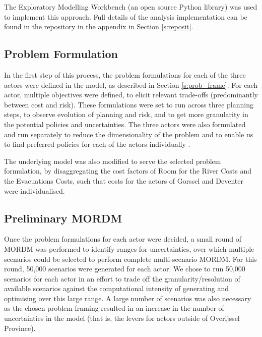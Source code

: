 The Exploratory Modelling Workbench (an open source Python library) was used to implement this approach. Full details of the analysis implementation can be found in the repository in the appendix in Section \ref{s:reposit}.

\subsection{Problem Formulation}
In the first step of this process, the problem formulations for each of the three actors were defined in the model, as described in Section \ref{s:prob_frame}. For each actor, multiple objectives were defined, to elicit relevant trade-offs (predominantly between cost and risk). These formulations were set to run across three planning steps, to observe evolution of planning and risk, and to get more granularity in the potential policies and uncertainties. The three actors were also formulated and run separately to reduce the dimensionality of the problem and to enable us to find preferred policies for each of the actors individually \parencite{trindade_reducing_2017}.

The underlying model was also modified to serve the selected problem formulation, by disaggregating the cost factors of Room for the River Costs and the Evacuations Costs, such that costs for the actors of Gorssel and Deventer were individualised.

\subsection{Preliminary MORDM}
Once the problem formulations for each actor were decided, a small round of MORDM was performed to identify ranges for uncertainties, over which multiple scenarios could be selected to perform complete multi-scenario MORDM. For this round, 50,000 scenarios were generated for each actor. We chose to run 50,000 scenarios for each actor in an effort to trade off the granularity/resolution of available scenarios against the computational intensity of generating and optimising over this large range. A large number of scenarios was also necessary as the chosen problem framing resulted in an increase in the number of uncertainties in the model (that is, the levers for actors outside of Overijssel Province).

